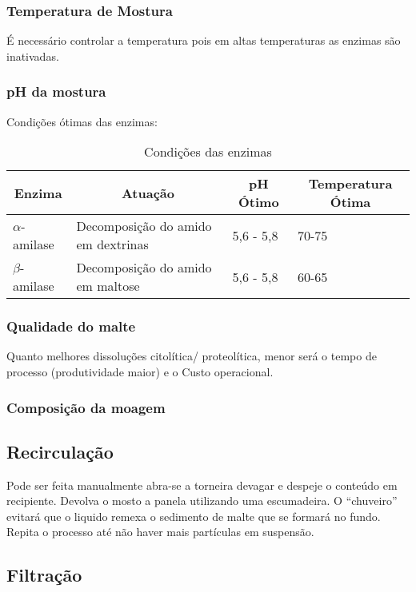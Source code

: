 \subsubsection{Temperatura de Mostura}
É necessário controlar a temperatura pois em altas temperaturas as enzimas são inativadas.


\subsubsection{pH da mostura}

Condições ótimas das enzimas:

\begin{table}[h]
\centering
\caption{Condições das enzimas}
\begin{tabular}{|l|l|l|l|}
\hline
\multicolumn{1}{|c|}{{\bf Enzima}} & \multicolumn{1}{c|}{{\bf Atuação}} & \multicolumn{1}{c|}{{\bf pH Ótimo}} & \multicolumn{1}{c|}{{\bf Temperatura Ótima}} \\ \hline
\(\alpha\)-amilase & Decomposição do amido em dextrinas & 5,6 - 5,8 & 70-75 \\ \hline
\(\beta\)-amilase & Decomposição do amido em maltose & 5,6 - 5,8 & 60-65 \\ \hline
\end{tabular}
\end{table}

\subsubsection{Qualidade do malte}
Quanto melhores dissoluções citolítica/ proteolítica, menor será o tempo de processo (produtividade maior) e o Custo operacional.

\subsubsection{Composição da moagem}

\subsection{Recirculação}

Pode ser feita manualmente abra-se a torneira devagar e despeje o conteúdo em recipiente. Devolva o mosto a panela utilizando uma escumadeira. O “chuveiro” evitará que o liquido remexa o sedimento de malte que se formará no fundo. Repita o processo até não haver mais partículas em suspensão.

\subsection{Filtração}

